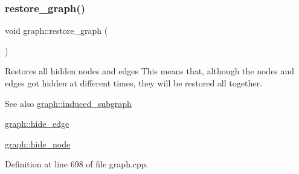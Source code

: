 \mbox{\label{classgraph_a53e2a5505fa6427587e12d66e4a86cec}} 
\subsubsection{\texorpdfstring{restore\+\_\+graph()}{restore\_graph()}}
{\footnotesize\ttfamily void graph\+::restore\+\_\+graph (\begin{DoxyParamCaption}{ }\end{DoxyParamCaption})\hspace{0.3cm}{\ttfamily [inherited]}}

Restores all hidden nodes and edges This means that, although the nodes and edges got hidden at different times, they will be restored all together.

\begin{DoxySeeAlso}{See also}
\mbox{\hyperlink{classgraph_a15b766094bb0b97ef53e06e7c26b2197}{graph\+::induced\+\_\+subgraph}} 

\mbox{\hyperlink{classgraph_ab2f8520bcac080d73c55228fecc61825}{graph\+::hide\+\_\+edge}} 

\mbox{\hyperlink{classgraph_a214618b5e3c02695779350532506e225}{graph\+::hide\+\_\+node}} 
\end{DoxySeeAlso}


Definition at line 698 of file graph.\+cpp.


